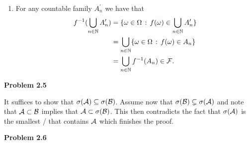 \begin{enumerate}[label=(\alph*)]
\begin{enumerate}[label=\arabic*.]
\begin{align*}
	f^{-1}(\Omega^\prime \setminus A^\prime) &= \{\omega \in \Omega \, : \, f(\omega) \notin A^\prime \}\\
	&= \Omega \setminus f^{-1}(A^\prime) \in \cF.
\end{align*}
\item For any countable family $A_n^\prime$ we have that
\begin{align*}
	f^{-1}(\bigcup_{n \in \mathbb N} A_n^\prime) &= \{\omega \in \Omega \, : \, f(\omega) \in \bigcup_{n \in \mathbb N} A_n^\prime\}\\
	&= \bigcup_{n \in \mathbb N} \{\omega \in \Omega \, : \, f(\omega) \in A_n\} \\
	&= \bigcup_{n \in \mathbb N} f^{-1}(A_n) \in \mathcal F.
\end{align*}
\end{enumerate}
\end{enumerate}

\bigskip

\textbf{Problem 2.5}

It suffices to show that $\sigma(\mathcal A) \subseteq \sigma(\mathcal B)$. Assume now that $\sigma(\mathcal B) \subsetneq \sigma(\mathcal A)$ and note that $\mathcal A \subset \mathcal B$ implies that $\mathcal A \subset \sigma(\mathcal B)$. This then contradicts the fact that $\sigma(\mathcal A)$ is the smallest \sigalg/ that contains $\mathcal A$ which finishes the proof. 

\bigskip

\textbf{Problem 2.6} 

